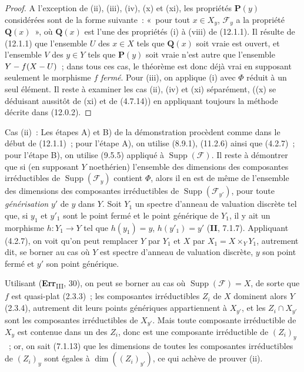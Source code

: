 \begin{proof}
A l'exception de (ii), (iii), (iv), (x) et (xi), les propriétés $\boldsymbol{P}(y)$
considérées sont de la forme suivante~: «~pour tout $x\in X_y$, $\mathcal F_y$
a la propriété $\boldsymbol{Q}(x)$~», où $\boldsymbol{Q}(x)$ est l'une des propriétés (i) à (viii) de
(12.1.1). Il résulte de (12.1.1) que l'ensemble $U$ des $x\in X$ tels que
$\boldsymbol{Q}(x)$ soit vraie est ouvert, et l'ensemble $V$ des $y\in Y$ tels que $\boldsymbol{P}(y)$
soit vraie n'est autre que l'ensemble $Y- f(X- U)$~; dans tous ces cas, le
théorème est donc déjà vrai en supposant seulement le morphisme $f$ \emph{fermé}.
Pour (iii), on applique (i) avec $\Phi$ réduit à un seul élément. Il reste à
examiner les cas (ii), (iv) et (xi) séparément, ((x) se déduisant aussitôt de
(xi) et de (4.7.14)) en appliquant toujours la méthode décrite dans (12.0.2).
\end{proof}

\begin{env}[12.2.1.1]
\label{IV.12.2.1.1-fr}
Cas (ii)~: Les étapes A) et B) de la démonstration procèdent comme dans le
début de (12.1.1)~; pour l'étape A), on utilise (8.9.1), (11.2.6) ainsi que
(4.2.7)~; pour l'étape B), on utilise (9.5.5) appliqué à
$\operatorname{Supp}(\mathcal F)$. Il reste à démontrer que si (en supposant
$Y$ noethérien) l'ensemble des dimensions des composantes irréductibles de
$\operatorname{Supp}(\mathcal F_y)$ contient $\Phi$, alors il en est de même
de l'ensemble des dimensions des composantes irréductibles de
$\operatorname{Supp}(\mathcal F_{y'})$, pour toute \emph{générisation} $y'$ de
$y$ dans $Y$. Soit $Y_1$ un spectre d'anneau de valuation discrète tel que, si
$y_1$ et $y'_1$ sont le point fermé et le point générique de $Y_1$, il y ait un
morphisme $h:Y_1\to Y$ tel que $h(y_1)=y$, $h(y'_1)=y'$ (\textbf{II}, 7.1.7).
Appliquant (4.2.7), on voit qu'on peut remplacer $Y$ par $Y_1$ et $X$ par
$X_1=X\times_YY_1$, autrement dit, se borner au cas où $Y$ est spectre
d'anneau de valuation discrète, $y$ son point fermé et $y'$ son point générique.

Utilisant (\textbf{Err}\textsubscript{III}, 30), on peut se borner au
cas où $\operatorname{Supp}(\mathcal F)=X$, de sorte que $f$ est quasi-plat
(2.3.3)~; les composantes irréductibles $Z_i$ de $X$ dominent alors $Y$
(2.3.4), autrement dit leurs points génériques appartiennent à $X_{y'}$, et
les $Z_i\cap X_{y'}$ sont les composantes irréductibles de $X_{y'}$. Mais toute
composante irréductible de $X_y$ est contenue dans un des $Z_i$, donc est une
composante irréductible de $(Z_i)_y$~; or, on sait (7.1.13) que les dimensions
de toutes les composantes irréductibles de $(Z_i)_y$ sont égales à
$\dim((Z_i)_{y'})$, ce qui achève de prouver (ii).
\end{env}

